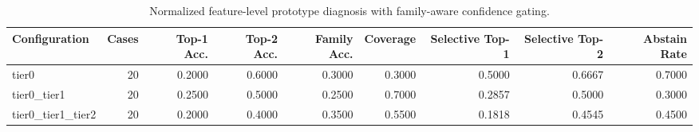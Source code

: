 \begin{table}[t]
\centering
\caption{Normalized feature-level prototype diagnosis with family-aware confidence gating.}
\label{tab:dice_stressor_hierarchical_diagnosis}
\footnotesize
\begin{tabular}{lrrrrrrrr}
\toprule
Configuration & Cases & Top-1 Acc. & Top-2 Acc. & Family Acc. & Coverage & Selective Top-1 & Selective Top-2 & Abstain Rate \\
\midrule
tier0 & 20 & 0.2000 & 0.6000 & 0.3000 & 0.3000 & 0.5000 & 0.6667 & 0.7000 \\
tier0_tier1 & 20 & 0.2500 & 0.5000 & 0.2500 & 0.7000 & 0.2857 & 0.5000 & 0.3000 \\
tier0_tier1_tier2 & 20 & 0.2000 & 0.4000 & 0.3500 & 0.5500 & 0.1818 & 0.4545 & 0.4500 \\
\bottomrule
\end{tabular}

\end{table}
